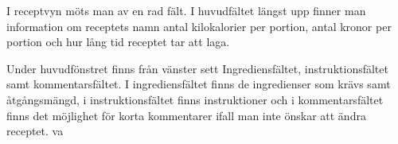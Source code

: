 I receptvyn möts man av en rad fält. I huvudfältet längst upp finner
man information om receptets namn antal kilokalorier per portion,
antal kronor per portion och hur lång tid receptet tar att laga.

Under huvudfönstret finns från vänster sett Ingrediensfältet,
instruktionsfältet samt kommentarsfältet. I ingrediensfältet finns de
ingredienser som krävs samt åtgångsmängd, i instruktionsfältet finns
instruktioner och i kommentarsfältet finns det möjlighet för korta
kommentarer ifall man inte önskar att ändra receptet. va
